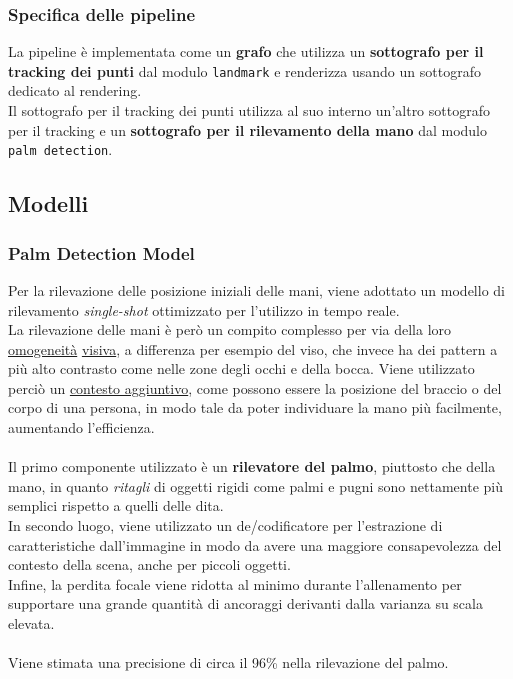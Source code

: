 \subsubsection{Specifica delle pipeline}
La pipeline è implementata come un \textbf{grafo} che utilizza un \textbf{sottografo per il tracking dei punti} dal modulo \texttt{landmark} e renderizza usando un sottografo dedicato al rendering.\\Il sottografo per il tracking dei punti utilizza al suo interno un'altro sottografo per il tracking e un \textbf{sottografo per il rilevamento della mano} dal modulo \texttt{palm detection}.

\subsection{Modelli}

\subsubsection{Palm Detection Model} 

Per la rilevazione delle posizione iniziali delle mani, viene adottato un modello di rilevamento \textit{single-shot} ottimizzato per l'utilizzo in tempo reale.\\
La rilevazione delle mani è però un compito complesso per via della loro \underline{omogeneità} \underline{visiva}, a differenza per esempio del viso, che invece ha dei pattern a più alto contrasto come nelle zone degli occhi e della bocca.
Viene utilizzato perciò un \underline{contesto aggiuntivo}, come possono essere la posizione del braccio o del corpo di una persona, in modo tale da poter individuare la mano più facilmente, aumentando l'efficienza.\\
\\
\noindent Il primo componente utilizzato è un \textbf{rilevatore del palmo}, piuttosto che della mano, in quanto \textit{ritagli} di oggetti rigidi come palmi e pugni sono nettamente più semplici rispetto a quelli delle dita.\\
In secondo luogo, viene utilizzato un de/codificatore per l'estrazione di caratteristiche dall'immagine in modo da avere una maggiore consapevolezza del contesto della scena, anche per piccoli oggetti.\\
Infine, la perdita focale viene ridotta al minimo durante l'allenamento per supportare una grande quantità di ancoraggi derivanti dalla varianza su scala elevata.\\
\\
\noindent Viene stimata una precisione di circa il 96\% nella rilevazione del palmo.

